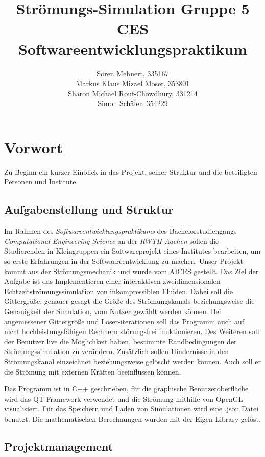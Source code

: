 \documentclass[a4paper,12pt]{scrreprt}
\title{
  Str\"omungs-Simulation Gruppe 5\\CES Softwareentwicklungspraktikum
}
\author{
  S\"oren Mehnert, 335167\\
  Markus Klaus Mizael Moser, 353801\\
  Sharon Michael Rouf-Chowdhury, 331214\\
  Simon Sch\"afer, 354229
}
\begin{document}
\maketitle
\tableofcontents

\chapter{Vorwort}

Zu Beginn ein kurzer Einblick in das Projekt, seiner Struktur und die beteiligten Personen und Institute.

\section{Aufgabenstellung und Struktur}

Im Rahmen des \textit{Softwareentwicklungspraktikums} des
Bachelorstudiengangs \textit{Computational Engineering Science} an der
\textit{RWTH Aachen} sollen die Studierenden in Kleingruppen ein
Softwareprojekt eines Institutes bearbeiten, um so erste Erfahrungen in der Softwaareentwicklung zu machen. Unser Projekt kommt aus der Str\"omungsmechanik und wurde vom AICES gestellt.
Das Ziel der Aufgabe ist das Implementieren einer interaktiven zweidimensionalen Echtzeitstr\"omungssimulation von inkompressiblen Fluiden. Dabei soll die Gittergr\"o\ss e, genauer gesagt die Gr\"o\ss e  des Str\"omungskanals beziehungsweise die Genauigkeit der Simulation, vom Nutzer gew\"ahlt werden k\"onnen. Bei angemessener Gittergr\"o\ss e und L\"oser-iterationen soll das Programm auch auf nicht hochleistungsf\"ahigen Rechnern st\"orungsfrei funktionieren. Des Weiteren soll der Benutzer live die M\"oglichkeit haben, bestimmte Randbedingungen der Str\"omungssimulation zu ver\"andern. Zus\"atzlich sollen Hindernisse in den Str\"omungskanal einzeichnet beziehungsweise gel\"oscht werden k\"onnen.
Auch soll er die Str\"omung mit externen Kr\"aften beeinflussen k\"onnen.

Das Programm ist in C++ geschrieben, für die graphische Benutzeroberfl\"ache wird das QT Framework verwendet und die Str\"omung mithilfe von OpenGL visualisiert. Für das Speichern und Laden von Simulationen wird eine .json Datei benutzt. Die mathematischen Berechnungen wurden mit der Eigen Library gel\"ost.

\section{Projektmanagement}
\end{document}
